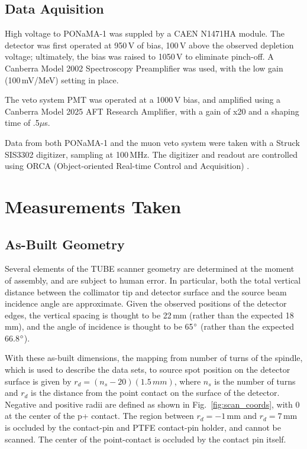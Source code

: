 \subsection{Data Aquisition}
High voltage to PONaMA-1 was suppled by a CAEN N1471HA module. The detector was first operated at 950\,V of bias, 100\,V above the observed depletion voltage; ultimately, the bias was raised to 1050\,V to eliminate pinch-off. A Canberra Model 2002 Spectroscopy Preamplifier was used, with the low gain (100\,mV/MeV) setting in place. 

The veto system PMT was operated at a 1000\,V bias, and amplified using a Canberra Model 2025 AFT Research Amplifier, with a gain of x20 and a shaping time of .5$\mu$s. 

Data from both PONaMA-1 and the muon veto system were taken with a Struck SIS3302 digitizer, sampling at 100\,MHz. The digitizer and readout are controlled using ORCA (Object-oriented Real-time Control and Acquisition) \cite{ORCA}.

\section{Measurements Taken} \label{sec:measurements}
\subsection{As-Built Geometry} \label{ssec:geometry}
Several elements of the TUBE scanner geometry are determined at the moment of assembly, and are subject to human error. In particular, both the total vertical distance between the collimator tip and detector surface and the source beam incidence angle are approximate. Given the observed positions of the detector edges, the vertical spacing is thought to be 22\,mm (rather than the expected 18\,mm), and the angle of incidence is thought to be 65$\degree$ (rather than the expected 66.8$\degree$). 

With these as-built dimensions, the mapping from number of turns of the spindle, which is used to describe the data sets, to source spot position on the detector surface is given by $r_d = (n_s-20)(1.5\,mm)$, where $n_s$ is the number of turns and $r_d$ is the distance from the point contact on the surface of the detector. Negative and positive radii are defined as shown in Fig.~\ref{fig:scan_coords}, with 0 at the center of the p+ contact. The region between $r_d = -1$\,mm and  $r_d = 7$\,mm is occluded by the contact-pin and PTFE contact-pin holder, and cannot be scanned. The center of the point-contact is occluded by the contact pin itself. 

